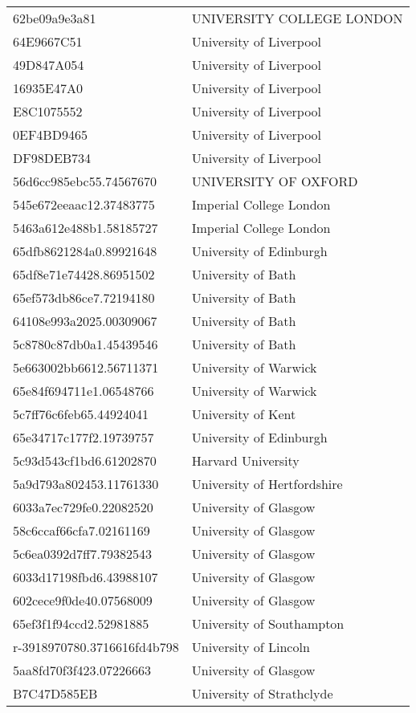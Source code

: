 \begin{tabular}{ll}
62be09a9e3a81 & UNIVERSITY COLLEGE LONDON \\
64E9667C51 & University of Liverpool \\
49D847A054 & University of Liverpool \\
16935E47A0 & University of Liverpool \\
E8C1075552 & University of Liverpool \\
0EF4BD9465 & University of Liverpool \\
DF98DEB734 & University of Liverpool \\
56d6cc985ebc55.74567670 & UNIVERSITY OF OXFORD \\
545e672eeaac12.37483775 & Imperial College London \\
5463a612e488b1.58185727 & Imperial College London \\
65dfb8621284a0.89921648 & University of Edinburgh \\
65df8e71e74428.86951502 & University of Bath \\
65ef573db86ce7.72194180 & University of Bath \\
64108e993a2025.00309067 & University of Bath \\
5c8780c87db0a1.45439546 & University of Bath \\
5e663002bb6612.56711371 & University of Warwick \\
65e84f694711e1.06548766 & University of Warwick \\
5c7ff76c6feb65.44924041 & University of Kent \\
65e34717c177f2.19739757 & University of Edinburgh \\
5c93d543cf1bd6.61202870 & Harvard University \\
5a9d793a802453.11761330 & University of Hertfordshire \\
6033a7ec729fe0.22082520 & University of Glasgow \\
58c6ccaf66cfa7.02161169 & University of Glasgow \\
5c6ea0392d7ff7.79382543 & University of Glasgow \\
6033d17198fbd6.43988107 & University of Glasgow \\
602cece9f0de40.07568009 & University of Glasgow \\
65ef3f1f94ccd2.52981885 & University of Southampton \\
r-3918970780.3716616fd4b798 & University of Lincoln \\
5aa8fd70f3f423.07226663 & University of Glasgow \\
B7C47D585EB & University of Strathclyde \\

\end{tabular}
